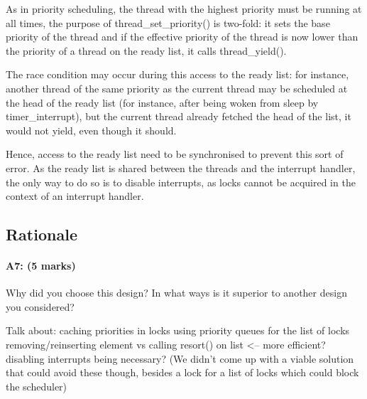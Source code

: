 As in priority scheduling, the thread with the highest priority must be running at all times, the purpose of thread\_set\_priority() is two-fold: it sets the base priority of the thread and if the effective priority of the thread is now lower than the priority of a thread on the ready list, it calls thread\_yield().

The race condition may occur during this access to the ready list: for instance, another thread of the same priority as the current thread may be scheduled at the head of the ready list (for instance, after being woken from sleep by timer\_interrupt), but the current thread already fetched the head of the list, it would not yield, even though it should.

Hence, access to the ready list need to be synchronised to prevent this sort of error. As the ready list is shared between the threads and the interrupt handler, the only way to do so is to disable interrupts, as locks cannot be acquired in the context of an interrupt handler.


\subsection{Rationale}
\paragraph{A7: (5 marks)}
Why did you choose this design?  In what ways is it superior to another design you considered?

Talk about:
	caching priorities in locks
	using priority queues for the list of locks
  removing/reinserting element vs calling resort() on list <-- more efficient?
	disabling interrupts being necessary? (We didn't come up with a viable solution that could avoid these though, besides a lock for a list of locks which could block the scheduler)

